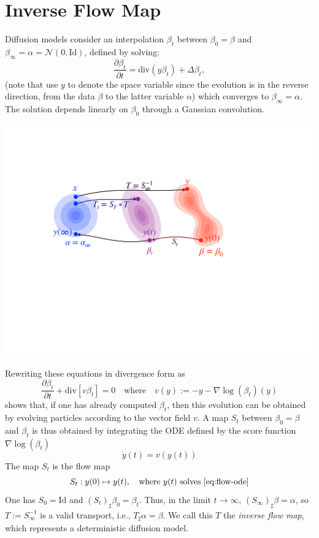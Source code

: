 \documentclass{article}
\begin{document}
\section{Inverse Flow Map}

Diffusion models consider an interpolation $\beta_t$ between $\beta_0 = \beta$ and $\beta_\infty = \alpha = \mathcal{N}(0,\text{Id})$, defined by solving:
\begin{equation}
    \frac{\partial \beta_t}{\partial t} = \text{div}(y \beta_t) + \Delta \beta_t,
\end{equation}
(note that use $y$ to denote the space variable since the evolution is in the reverse direction, from the data $\beta$ to the latter variable $\alpha$) which converges to $\beta_\infty = \alpha$. The solution depends linearly on $\beta_0$ through a Gaussian convolution.

\begin{center}
\includegraphics[width=.63\linewidth]{fig-interp.pdf}
\end{center}

Rewriting these equations in divergence form as
$$
	\frac{\partial \beta_t}{\partial t} + \text{div}[ v \beta_t ] = 0
	\quad\text{where}\quad v(y) := - y - \nabla \log(\beta_t)(y)
$$
shows that, if one has already computed $\beta_t$, then this evolution can be obtained by evolving particles according to the vector field $v$. 
%
A map $S_t$ between $\beta_0=\beta$ and $\beta_t$ is thus obtained by integrating the ODE defined by the score function $\nabla \log(\beta_t)$
\begin{equation}\label{eq:flow-ode}
    \dot{y}(t) = v(y(t)) %
\end{equation}
The map $S_t$ is the flow map
\begin{equation}
    S_t : y(0) \mapsto y(t), \quad \text{where } y(t) \text{ solves \eqref{eq:flow-ode}} 
\end{equation}
One has $S_0 = \text{Id}$ and $(S_t)_\sharp \beta_0 = \beta_t$. Thus, in the limit $t \to \infty$, $(S_\infty)_\sharp \beta = \alpha$, so $T := S_\infty^{-1}$ is a valid transport, i.e., $T_\sharp \alpha = \beta$. We call this $T$ the \emph{inverse flow map}, which represents a deterministic diffusion model.
\end{document}
